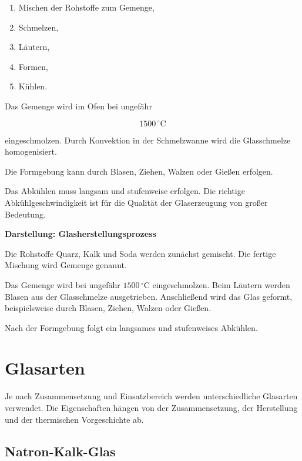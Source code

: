 \documentclass[
  12pt,
  a4paper,
  oneside
]{scrreprt}
\begin{document}
\begin{enumerate}
  \item Mischen der Rohstoffe zum Gemenge,
  \item Schmelzen,
  \item Läutern,
  \item Formen,
  \item Kühlen.
\end{enumerate}



Das Gemenge wird im Ofen bei ungefähr

\begin{equation}
  1500\,^\circ\mathrm{C}
\end{equation}

eingeschmolzen. Durch Konvektion in der Schmelzwanne wird die
Glasschmelze homogenisiert. 

Die Formgebung kann durch Blasen, Ziehen, Walzen oder Gießen erfolgen.


Das Abkühlen muss langsam und stufenweise erfolgen. Die richtige
Abkühlgeschwindigkeit ist für die Qualität der Glaserzeugung von großer
Bedeutung. 

\begin{darstellungsbox}
\textbf{Darstellung: Glasherstellungsprozess}

Die Rohstoffe Quarz, Kalk und Soda werden zunächst gemischt. Die
fertige Mischung wird Gemenge genannt.

Das Gemenge wird bei ungefähr $1500\,^\circ\mathrm{C}$ eingeschmolzen.
Beim Läutern werden Blasen aus der Glasschmelze ausgetrieben.
Anschließend wird das Glas geformt, beispielsweise durch Blasen,
Ziehen, Walzen oder Gießen.

Nach der Formgebung folgt ein langsames und stufenweises Abkühlen.
\end{darstellungsbox}

\section{Glasarten}

Je nach Zusammensetzung und Einsatzbereich werden unterschiedliche
Glasarten verwendet. Die Eigenschaften hängen von der Zusammensetzung,
der Herstellung und der thermischen Vorgeschichte ab. 

\subsection{Natron-Kalk-Glas}
\end{document}
